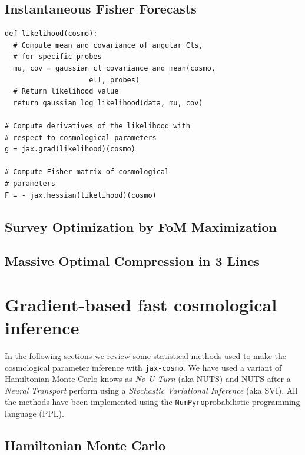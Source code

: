 \documentclass[final,5p,times,twocolumn,authoryear]{elsarticle}
\newcommand{\numpyro}{\texttt{NumPyro}}
\newcommand{\jaxcosmo}{\texttt{jax-cosmo}}
\begin{document}
\subsection{Instantaneous Fisher Forecasts}
\label{sec-fisher-forecast}
\begin{verbatim}
def likelihood(cosmo):
  # Compute mean and covariance of angular Cls, 
  # for specific probes
  mu, cov = gaussian_cl_covariance_and_mean(cosmo, 
                    ell, probes)
  # Return likelihood value
  return gaussian_log_likelihood(data, mu, cov)

# Compute derivatives of the likelihood with 
# respect to cosmological parameters
g = jax.grad(likelihood)(cosmo)

# Compute Fisher matrix of cosmological 
# parameters
F = - jax.hessian(likelihood)(cosmo)
\end{verbatim}



\subsection{Survey Optimization by FoM Maximization}
\label{sec-FOM-optimisation}

\subsection{Massive Optimal Compression in 3 Lines}


\section{Gradient-based fast cosmological inference}
%
In the following sections we review some statistical methods used to make the cosmological parameter inference with \jaxcosmo. We have used a variant of Hamiltonian Monte Carlo knows as \textit{No-U-Turn} (aka NUTS) and NUTS after a \textit{Neural Transport} perform using a \textit{Stochastic Variational Inference} (aka SVI). All  the methods have been implemented using the \numpyro probabilistic programming language (PPL). 
%
%
\subsection{Hamiltonian Monte Carlo}
%
\end{document}
